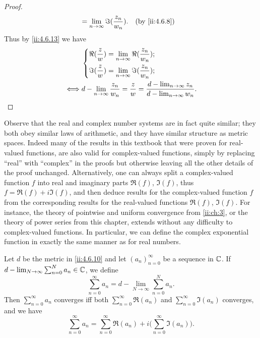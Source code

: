 \begin{proof}
\begin{align*}
                      & = \lim_{n \to \infty} \Im(\dfrac{z_n}{w_n}).                                                                       &  & \by{ii:4.6.8}
  \end{align*}
  Thus by \cref{ii:4.6.13} we have
  \begin{align*}
         & \begin{dcases}
             \Re(\dfrac{z}{w}) = \lim_{n \to \infty} \Re(\dfrac{z_n}{w_n}); \\
             \Im(\dfrac{z}{w}) = \lim_{n \to \infty} \Im(\dfrac{z_n}{w_n});
           \end{dcases}                                                              \\
    \iff & d - \lim_{n \to \infty} \dfrac{z_n}{w_n} = \dfrac{z}{w} = \dfrac{d - \lim_{n \to \infty} z_n}{d - \lim_{n \to \infty} w_n}.
  \end{align*}
\end{proof}

\begin{note}
  Observe that the real and complex number systems are in fact quite similar;
  they both obey similar laws of arithmetic, and they have similar structure as metric spaces.
  Indeed many of the results in this textbook that were proven for real-valued functions, are also valid for complex-valued functions, simply by replacing ``real'' with ``complex'' in the proofs but otherwise leaving all the other details of the proof unchanged.
  Alternatively, one can always split a complex-valued function \(f\) into real and imaginary parts \(\Re(f)\), \(\Im(f)\), thus \(f = \Re(f) + i \Im(f)\), and then deduce results for the complex-valued function \(f\) from the corresponding results for the real-valued functions \(\Re(f)\), \(\Im(f)\).
  For instance, the theory of pointwise and uniform convergence from \cref{ii:ch:3}, or the theory of power series from this chapter, extends without any difficulty to complex-valued functions.
  In particular, we can define the complex exponential function in exactly the same manner as for real numbers.
\end{note}

\begin{ac}\label{ii:ac:4.6.6}
  Let \(d\) be the metric in \cref{ii:4.6.10} and let \((a_n)_{n = 0}^\infty\) be a sequence in \(\mathbb{C}\).
  If \(d - \lim_{N \to \infty} \sum_{n = 0}^N a_n \in \mathbb{C}\), we define
  \[
    \sum_{n = 0}^\infty a_n = d - \lim_{N \to \infty} \sum_{n = 0}^N a_n.
  \]
  Then \(\sum_{n = 0}^\infty a_n\) converges iff both \(\sum_{n = 0}^\infty \Re(a_n)\) and \(\sum_{n = 0}^\infty \Im(a_n)\) converges, and we have
  \[
    \sum_{n = 0}^\infty a_n = \sum_{n = 0}^\infty \Re(a_n) + i \bigg(\sum_{n = 0}^\infty \Im(a_n)\bigg).
  \]
\end{ac}

